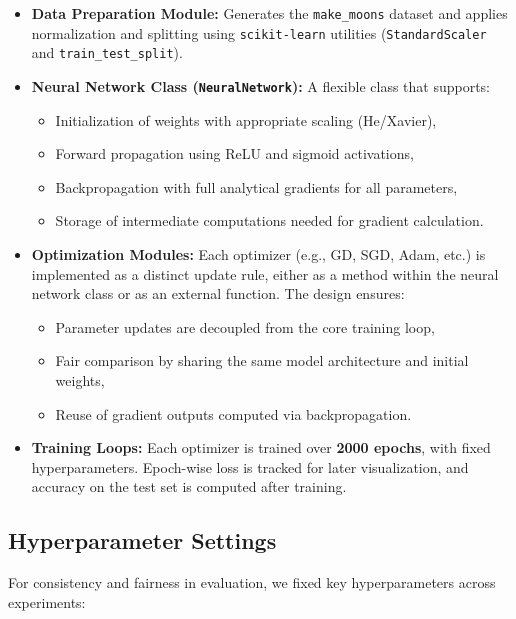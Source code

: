 \documentclass[12pt]{article}
\begin{document}
\begin{itemize}
    \item \textbf{Data Preparation Module:} Generates the \texttt{make\_moons} dataset and applies normalization and splitting using \texttt{scikit-learn} utilities (\texttt{StandardScaler} and \texttt{train\_test\_split}).
    
    \item \textbf{Neural Network Class (\texttt{NeuralNetwork}):} A flexible class that supports:
    \begin{itemize}
        \item Initialization of weights with appropriate scaling (He/Xavier),
        \item Forward propagation using ReLU and sigmoid activations,
        \item Backpropagation with full analytical gradients for all parameters,
        \item Storage of intermediate computations needed for gradient calculation.
    \end{itemize}
    
    \item \textbf{Optimization Modules:} Each optimizer (e.g., GD, SGD, Adam, etc.) is implemented as a distinct update rule, either as a method within the neural network class or as an external function. The design ensures:
    \begin{itemize}
        \item Parameter updates are decoupled from the core training loop,
        \item Fair comparison by sharing the same model architecture and initial weights,
        \item Reuse of gradient outputs computed via backpropagation.
    \end{itemize}
    
    \item \textbf{Training Loops:} Each optimizer is trained over \textbf{2000 epochs}, with fixed hyperparameters. Epoch-wise loss is tracked for later visualization, and accuracy on the test set is computed after training.
\end{itemize}

\subsection{Hyperparameter Settings}

For consistency and fairness in evaluation, we fixed key hyperparameters across experiments:
\end{document}
